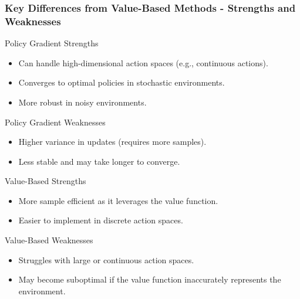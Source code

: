 \documentclass{beamer}
\begin{document}
\begin{frame}[fragile]
    \frametitle{Key Differences from Value-Based Methods - Strengths and Weaknesses}
    \begin{block}{Policy Gradient Strengths}
        \begin{itemize}
            \item Can handle high-dimensional action spaces (e.g., continuous actions).
            \item Converges to optimal policies in stochastic environments.
            \item More robust in noisy environments.
        \end{itemize}
    \end{block}
    
    \begin{block}{Policy Gradient Weaknesses}
        \begin{itemize}
            \item Higher variance in updates (requires more samples).
            \item Less stable and may take longer to converge.
        \end{itemize}
    \end{block}

    \begin{block}{Value-Based Strengths}
        \begin{itemize}
            \item More sample efficient as it leverages the value function.
            \item Easier to implement in discrete action spaces.
        \end{itemize}
    \end{block}

    \begin{block}{Value-Based Weaknesses}
        \begin{itemize}
            \item Struggles with large or continuous action spaces.
            \item May become suboptimal if the value function inaccurately represents the environment.
        \end{itemize}
    \end{block}
\end{frame}
\end{document}
